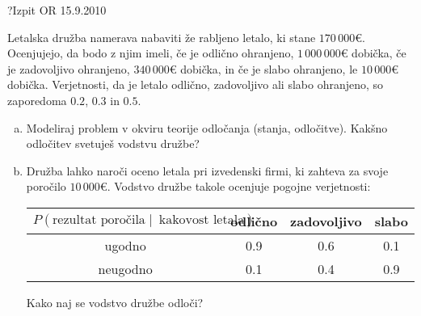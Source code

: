 \begin{naloga}{?}{Izpit OR 15.9.2010}
\begin{vprasanje}
Letalska družba namerava nabaviti že rabljeno letalo, ki stane $170\,000 €$.
Ocenjujejo, da bodo z njim imeli,
če je odlično ohranjeno, $1\,000\,000 €$ dobička,
če je zadovoljivo ohranjeno, $340\,000 €$ dobička,
in če je slabo ohranjeno, le $10\,000 €$ dobička.
Verjetnosti, da je letalo odlično, zadovoljivo ali slabo ohranjeno,
so zaporedoma $0.2$, $0.3$ in $0.5$.
\begin{enumerate}[(a)]
\item Modeliraj problem v okviru teorije odločanja (stanja, odločitve).
Kakšno odločitev svetuješ vodstvu družbe?

\item Družba lahko naroči oceno letala pri izvedenski firmi,
ki zahteva za svoje poročilo $10\,000 €$.
Vodstvo družbe takole ocenjuje pogojne verjetnosti:
\begin{center}
\begin{tabular}{c|ccc}
$P(\text{rezultat poročila} \;|\;\ \text{kakovost letala})$
& odlično & zadovoljivo & slabo \\ \hline
ugodno & 0.9 & 0.6 & 0.1 \\
neugodno & 0.1 & 0.4 & 0.9
\end{tabular}
\end{center}
Kako naj se vodstvo družbe odloči?
\end{enumerate}

\end{vprasanje}
\begin{odgovor}
\end{odgovor}
\end{naloga}
